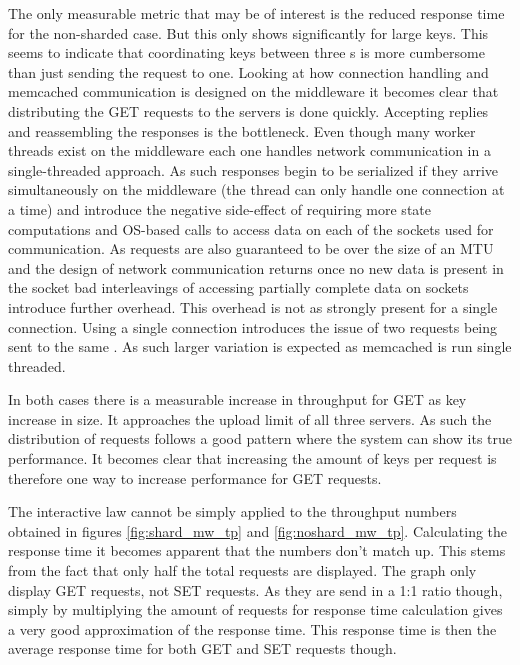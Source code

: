         The only measurable metric that may be of interest is the reduced response time for the non-sharded case. But
        this only shows significantly for large keys. This seems to indicate that coordinating keys between three
        \srv{}s is more cumbersome than just sending the request to one. Looking at how connection handling and
        memcached communication is designed on the middleware it becomes clear that distributing the GET requests to the
        servers is done quickly. Accepting replies and reassembling the responses is the bottleneck. Even though many
        worker threads exist on the middleware each one handles network communication in a single-threaded approach. As
        such responses begin to be serialized if they arrive simultaneously on the middleware (the thread can only
        handle one connection at a time) and introduce the negative side-effect of requiring more state computations and
        OS-based calls to access data on each of the sockets used for communication. As requests are also guaranteed to
        be over the size of an MTU and the design of network communication returns once no new data is present in the
        socket bad interleavings of accessing partially complete data on sockets introduce further overhead. This
        overhead is not as strongly present for a single connection. Using a single connection introduces the issue of
        two requests being sent to the same \srv{}. As such larger variation is expected as memcached is run single
        threaded.

        In both cases there is a measurable increase in throughput for GET as key increase in size. It approaches the
        upload limit of all three servers. As such the distribution of requests follows a good pattern where the system
        can show its true performance. It becomes clear that increasing the amount of keys per request is therefore one
        way to increase performance for GET requests.

        The interactive law cannot be simply applied to the throughput numbers obtained in figures \ref{fig:shard_mw_tp}
        and \ref{fig:noshard_mw_tp}. Calculating the response time it becomes apparent that the numbers don't match up.
        This stems from the fact that only half the total requests are displayed. The graph only display GET requests,
        not SET requests. As they are send in a 1:1 ratio though, simply by multiplying the amount of requests for
        response time calculation gives a very good approximation of the response time. This response time is then the
        average response time for both GET and SET requests though.


